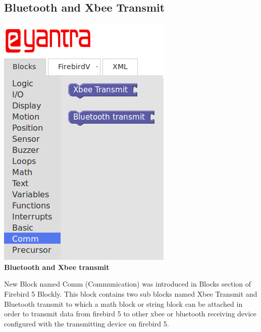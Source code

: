 \documentclass[a4paper,12pt,oneside]{book}
\begin{document}
\subsection{Bluetooth and Xbee Transmit}
    \begin{center}
    \includegraphics[scale =0.6]{xbtransm}\\[.3in]
    \textbf{Bluetooth and Xbee transmit}\\[1.3in]
    \end{center}
    New Block named Comm (Communication) was introduced in Blocks section of Firebird 5 Blockly. This block contains two sub blocks named Xbee Transmit and Bluetooth transmit to which a math block or string block can be attached in order to transmit data from firebird 5 to other xbee or bluetooth receiving device configured with the transmitting device on firebird 5. 
\end{document}
